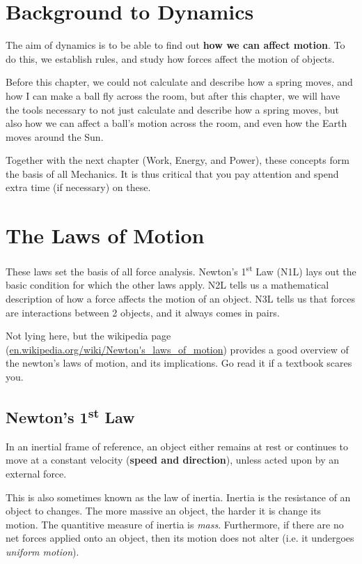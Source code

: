 \documentclass[11pt]{article}
\numberwithin{equation}{section}
\begin{document}
	\hdashrule{\textwidth}{0.1mm}{1pt}
	
	\pagebreak
	\section{Background to Dynamics}
	The aim of dynamics is to be able to find out \textbf{how we can affect motion}. To do this, we establish rules, and study how forces affect the motion of objects. 
	
	Before this chapter, we could not calculate and describe how a spring moves, and how I can make a ball fly across the room, but after this chapter, we will have the tools necessary to not just calculate and describe how a spring moves, but also how we can affect a ball's motion across the room, and even how the Earth moves around the Sun. 
	
	Together with the next chapter (Work, Energy, and Power), these concepts form the basis of all Mechanics. It is thus critical that you pay attention and spend extra time (if necessary) on these. 
	
	\section{The Laws of Motion}
	These laws set the basis of all force analysis. Newton's 1\textsuperscript{st} Law (N1L) lays out the basic condition for which the other laws apply. N2L tells us a mathematical description of how a force affects the motion of an object. N3L tells us that forces are interactions between 2 objects, and it always comes in pairs.
	
	Not lying here, but the wikipedia page (\url{en.wikipedia.org/wiki/Newton's_laws_of_motion}) provides a good overview of the newton's laws of motion, and its implications. Go read it if a textbook scares you. 
		\subsection{Newton's 1\textsuperscript{st} Law}
		\begin{shaded}
		 	In an inertial frame of reference, an object either remains at rest or continues to move at a constant velocity (\textbf{speed and direction}), unless acted upon by an external force.
		\end{shaded}
	
		This is also sometimes known as the law of inertia. Inertia is the resistance of an object to changes. The more massive an object, the harder it is change its motion. The quantitive measure of inertia is \textit{mass}.	Furthermore, if there are no net forces applied onto an object, then its motion does not alter (i.e. it undergoes \textit{uniform motion}). 
		
\end{document}
